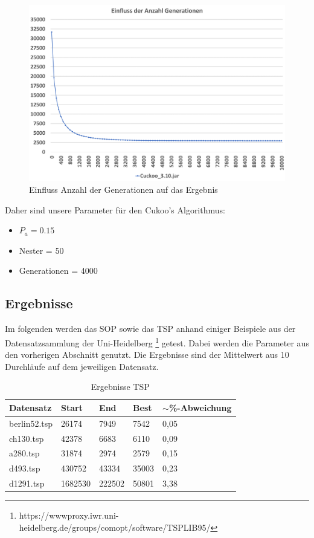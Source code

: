 \documentclass[conference]{IEEEtran}
\begin{document}
      \begin{figure}[H]
        \centering
        \includegraphics[width=0.8\linewidth]{Generation2.png}
        \caption{Einfluss Anzahl der Generationen auf das Ergebnis}
        \label{fig:generation}
      \end{figure}

      Daher sind unsere Parameter für den Cukoo's Algorithmus:
      \begin{itemize}
        \item $P_a = 0.15$
        \item Nester = 50
        \item Generationen = 4000
      \end{itemize}

    \subsection{Ergebnisse}
      Im folgenden werden das SOP sowie das TSP anhand einiger Beispiele aus der Datensatzsammlung der Uni-Heidelberg
      \footnote{https://wwwproxy.iwr.uni-heidelberg.de/groups/comopt/software/TSPLIB95/} getest.
      Dabei werden die Parameter aus den vorherigen Abschnitt genutzt. 
      Die Ergebnisse sind der Mittelwert aus 10 Durchläufe auf dem jeweiligen Datensatz.


      \begin{table}[H]
        \label{table:TSP}
        \centering
        \begin{tabular}{|l|ll|l|l|}
        \hline
            Datensatz & \multicolumn{1}{l|}{Start} & End  & Best & $\sim$\%-Abweichung \\ \hline
            berlin52.tsp  & \multicolumn{1}{l|}{26174} & 7949 & 7542 & 0,05       \\ \hline
            ch130.tsp  & \multicolumn{1}{l|}{42378} & 6683 & 6110 & 0,09       \\ \hline
            a280.tsp  & \multicolumn{1}{l|}{31874} & 2974 & 2579 & 0,15       \\ \hline
            d493.tsp  & \multicolumn{1}{l|}{430752} & 43334 & 35003 & 0,23       \\ \hline
            d1291.tsp  & \multicolumn{1}{l|}{1682530} & 222502 & 50801 & 3,38       \\ \hline
        \end{tabular}
        \caption{Ergebnisse TSP}
      \end{table}
\end{document}
